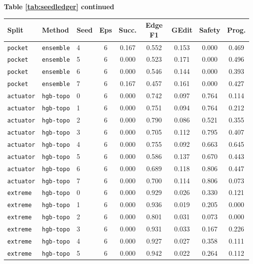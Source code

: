 \documentclass{article}
\begin{document}
\begin{center}
\textbf{Table \ref{tab:seedledger} continued}\\[0.4ex]
\begin{tabular}{lllcccccc}
\toprule
Split & Method & Seed & Eps & Succ. & Edge F1 & GEdit & Safety & Prog. \\
\midrule
\texttt{pocket} & \texttt{ensemble} & 4 & 6 & 0.167 & 0.552 & 0.153 & 0.000 & 0.469 \\
\texttt{pocket} & \texttt{ensemble} & 5 & 6 & 0.000 & 0.523 & 0.171 & 0.000 & 0.496 \\
\texttt{pocket} & \texttt{ensemble} & 6 & 6 & 0.000 & 0.546 & 0.144 & 0.000 & 0.393 \\
\texttt{pocket} & \texttt{ensemble} & 7 & 6 & 0.167 & 0.457 & 0.161 & 0.000 & 0.427 \\
\texttt{actuator} & \texttt{hgb-topo} & 0 & 6 & 0.000 & 0.742 & 0.097 & 0.764 & 0.114 \\
\texttt{actuator} & \texttt{hgb-topo} & 1 & 6 & 0.000 & 0.751 & 0.094 & 0.764 & 0.212 \\
\texttt{actuator} & \texttt{hgb-topo} & 2 & 6 & 0.000 & 0.790 & 0.086 & 0.521 & 0.355 \\
\texttt{actuator} & \texttt{hgb-topo} & 3 & 6 & 0.000 & 0.705 & 0.112 & 0.795 & 0.407 \\
\texttt{actuator} & \texttt{hgb-topo} & 4 & 6 & 0.000 & 0.755 & 0.092 & 0.663 & 0.645 \\
\texttt{actuator} & \texttt{hgb-topo} & 5 & 6 & 0.000 & 0.586 & 0.137 & 0.670 & 0.443 \\
\texttt{actuator} & \texttt{hgb-topo} & 6 & 6 & 0.000 & 0.689 & 0.118 & 0.806 & 0.447 \\
\texttt{actuator} & \texttt{hgb-topo} & 7 & 6 & 0.000 & 0.700 & 0.114 & 0.806 & 0.073 \\
\texttt{extreme} & \texttt{hgb-topo} & 0 & 6 & 0.000 & 0.929 & 0.026 & 0.330 & 0.121 \\
\texttt{extreme} & \texttt{hgb-topo} & 1 & 6 & 0.000 & 0.936 & 0.019 & 0.205 & 0.000 \\
\texttt{extreme} & \texttt{hgb-topo} & 2 & 6 & 0.000 & 0.801 & 0.031 & 0.073 & 0.000 \\
\texttt{extreme} & \texttt{hgb-topo} & 3 & 6 & 0.000 & 0.931 & 0.033 & 0.167 & 0.226 \\
\texttt{extreme} & \texttt{hgb-topo} & 4 & 6 & 0.000 & 0.927 & 0.027 & 0.358 & 0.111 \\
\texttt{extreme} & \texttt{hgb-topo} & 5 & 6 & 0.000 & 0.942 & 0.022 & 0.264 & 0.112 \\

\end{tabular}
\end{center}
\end{document}

